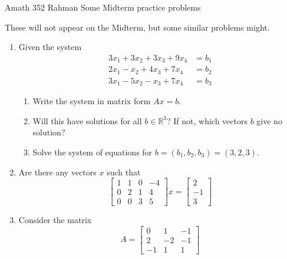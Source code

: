 \documentclass[14pt]{amsart}
\newcommand{\R}{\mathbb{R}}
\begin{document}
\begin{flushleft}
{\sc \Large Amath 352 Rahman} \hfill Some Midterm practice problems
\bigskip
\end{flushleft}

These will not appear on the Midterm, but some similar problems might.

\Large

\begin{enumerate}

\setlength\itemsep{1em}

\item  Given the system
%
\begin{equation*}
\begin{split}
3x_1 + 3x_2 + 3x_3 + 9x_4 &= b_1\\
2x_1 - x_2 + 4x_3 + 7x_4 &= b_2\\
3x_1 - 5x_2 - x_3 + 7 x_4 &= b_3
\end{split}
\end{equation*}

\begin{enumerate}

\item  Write the system in matrix form $Ax = b$.

\item  Will this have solutions for all $b \in \R^3$?  If not, which vectors $b$ give no solution?

\item  Solve the system of equations for $b = (b_1, b_2, b_3) = (3, 2, 3)$.

\end{enumerate}

\item  Are there any vectors $x$ such that
%
\begin{equation*}
\begin{bmatrix}
1 & 1 & 0 & -4\\
0 & 2 & 1 & 4\\
0 & 0 & 3 & 5
\end{bmatrix}x = \begin{bmatrix}
2\\
-1\\
3
\end{bmatrix}
\end{equation*}

\item  Consider the matrix
%
\begin{equation*}
A = \begin{bmatrix}
0 & 1 & -1\\
2 & -2 & -1\\
-1 & 1 & 1
\end{bmatrix}
\end{equation*}


\end{enumerate}
\end{document}

